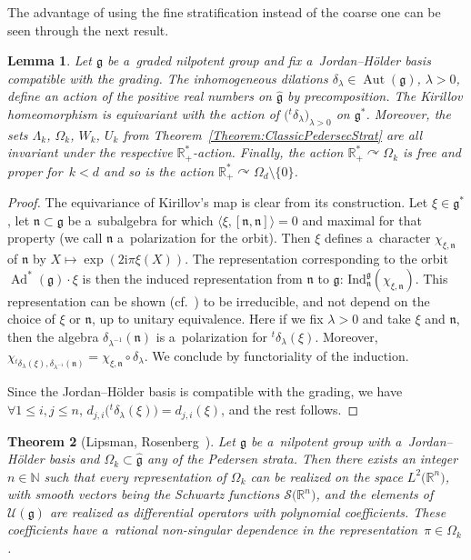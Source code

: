 \documentclass[pdftex]{sigma}
\newcommand{\tsp}[1]{{}^t \! #1} %
\newcommand{\ii}{\mathrm{i}} %
\newcommand{\R}{\mathbb R} %
\newcommand{\N}{\mathbb N} %
\newcommand{\Aut}{\operatorname{Aut}} %
\newcommand{\Ad}{\operatorname{Ad}} %
\newcommand{\g}{\mathfrak{g}} %
\newcommand{\n}{\mathfrak{n}} %
\newcommand{\act}{\curvearrowright} %
\newcommand{\lag}{\langle}
\newcommand{\rag}{\rangle}
\numberwithin{equation}{section}
\newtheorem{thm}{Theorem}[section]
\newtheorem{lem}[thm]{Lemma}
\theoremstyle{definition}
\begin{document}
The advantage of using the fine stratification instead of the coarse one can be seen through the next result.

\begin{lem}
 Let $\g$ be a~graded nilpotent group and fix a~Jordan--H\"older basis compatible with the grading. The inhomogeneous dilations $\delta_{\lambda} \in \Aut(\g)$, $\lambda > 0$, define an action of the positive real numbers on $\widehat{\g}$ by precomposition. The Kirillov homeomorphism \smash{$\widehat{\g} \cong {\g^*}/{\Ad^*(G)}$} is equivariant with the action of $\bigl(\tsp\delta_{\lambda}\bigr)_{\lambda > 0}$ on $\g^*$.
 Moreover, the sets $\Lambda_k$, $\Omega_k$, $W_k$, $U_k$ from Theorem~{\rm\ref{Theorem:ClassicPedersecStrat}} are all invariant under the respective $\R^*_+$-action.
 Finally, the action $\R^*_+ \act \Omega_k$ is free and proper for~${k < d}$ and so is the action $\R^*_+\act \Omega_d\setminus\{0\}$.
\end{lem}

\begin{proof}
 The equivariance of Kirillov's map is clear from its construction. Let $\xi \in \g^*$, let $\n \subset \g$ be a~subalgebra for which $\lag\xi,[\n,\n]\rag = 0$ and maximal for that property (we call $\n$ a~polarization for the orbit). Then $\xi$ defines a~character $\chi_{\xi,\n}$ of $\n$ by $X \mapsto \exp(2\ii \pi \xi(X))$. The representation corresponding to the orbit $\Ad^*(\g)\cdot \xi$ is then the induced representation from $\n$ to $\g$: $\mathrm{Ind}_{\n}^{\g}(\chi_{\xi,\n})$. This representation can be shown (cf.\ \cite{Kirillov}) to be irreducible, and not depend on the choice of $\xi$ or $\n$, up to unitary equivalence. Here if we fix $\lambda > 0$ and take $\xi$ and $\n$, then the algebra $\delta_{\lambda^{-1}}(\n)$ is a~polarization for $\tsp\delta_{\lambda}(\xi)$. Moreover, $\chi_{\tsp\delta_{\lambda}(\xi),\delta_{\lambda^{-1}}(\n)} = \chi_{\xi,\n}\circ \delta_{\lambda}$.
 We conclude by functoriality of the induction.

 Since the Jordan--H\"older basis is compatible with the grading, we have $\forall 1\leq i, j\leq n$, $ d_{j,i}\bigl(\tsp\delta_{\lambda}(\xi)\bigr) = d_{j,i}(\xi)$,
 and the rest follows.
\end{proof}

\begin{thm}[Lipsman, Rosenberg~\cite{LipsmanRosenberg}]
 Let $\g$ be a~nilpotent group with a~Jordan--H\"older basis and $\Omega_k \subset \widehat{\g}$ any of the Pedersen strata. Then there exists an integer $n \in \N$ such that every representation of $\Omega_k$ can be realized on the space $L^2\bigl(\R^n\bigr)$, with smooth vectors being the Schwartz functions $\mathscr{S}\bigl(\R^n\bigr)$, and the elements of $\mathcal{U}(\g)$ are realized as differential operators with polynomial coefficients. These coefficients have a~rational non-singular dependence in the representation~${\pi\in \Omega_k}$.
\end{thm}
\end{document}
